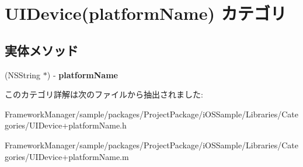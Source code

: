 \hypertarget{category_u_i_device_07platform_name_08}{}\section{U\+I\+Device(platform\+Name) カテゴリ}
\label{category_u_i_device_07platform_name_08}
\subsection*{実体メソッド}
\begin{DoxyCompactItemize}
\item 
\hypertarget{category_u_i_device_07platform_name_08_aa1181aa376b98b97ff89dc650e98acf6}{}(N\+S\+String $\ast$) -\/ {\bfseries platform\+Name}\label{category_u_i_device_07platform_name_08_aa1181aa376b98b97ff89dc650e98acf6}

\end{DoxyCompactItemize}


このカテゴリ詳解は次のファイルから抽出されました\+:\begin{DoxyCompactItemize}
\item 
Framework\+Manager/sample/packages/\+Project\+Package/i\+O\+S\+Sample/\+Libraries/\+Categories/U\+I\+Device+platform\+Name.\+h\item 
Framework\+Manager/sample/packages/\+Project\+Package/i\+O\+S\+Sample/\+Libraries/\+Categories/U\+I\+Device+platform\+Name.\+m\end{DoxyCompactItemize}
